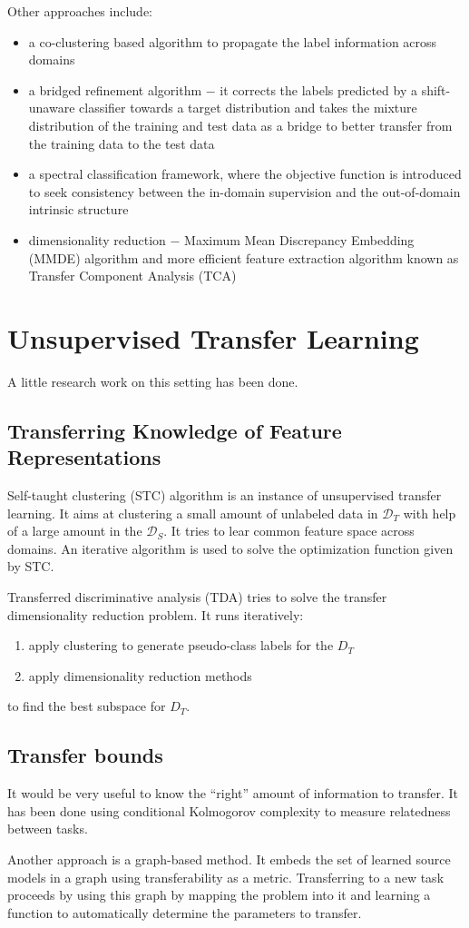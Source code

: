 \documentclass[a4paper,twocolumn]{article}
\newcommand{\D}{\mathcal{D}}
\begin{document}
Other approaches include:
\begin{itemize}
    \item a co-clustering based algorithm to propagate the label information across domains
    \item a bridged refinement algorithm $-$ it corrects the labels predicted by a shift-unaware classifier towards a target distribution and takes the mixture distribution of the training and test data as a bridge to better transfer from the training data to the test data
    \item a spectral classification framework, where the objective function is introduced to seek consistency between the in-domain supervision and the out-of-domain intrinsic structure
    \item dimensionality reduction $-$ Maximum Mean Discrepancy Embedding (MMDE) algorithm and more efficient feature extraction algorithm known as Transfer Component Analysis (TCA)
\end{itemize}

\section{Unsupervised Transfer Learning}
A little research work on this setting has been done.

\subsection{Transferring Knowledge of Feature Representations}
Self-taught clustering (STC) algorithm is an instance of unsupervised transfer learning. It aims at clustering a small amount of unlabeled data in $\D_T$ with help of a large amount in the $\D_S$. It tries to lear common feature space across domains. An iterative algorithm is used to solve the optimization function given by STC.

Transferred discriminative analysis (TDA) tries to solve the transfer dimensionality reduction problem. It runs iteratively:
\begin{enumerate}
    \item apply clustering to generate pseudo-class labels for the $D_T$
    \item apply dimensionality reduction methods
\end{enumerate}
to find the best subspace for $D_T$.

\subsection*{Transfer bounds}
It would be very useful to know the ``right'' amount of information to transfer. It has been done using conditional Kolmogorov complexity to measure relatedness between tasks.

Another approach is a graph-based method. It embeds the set of learned source models in a graph using transferability as a metric. Transferring to a new task proceeds by using this graph by mapping the problem into it and learning a function to automatically determine the parameters to transfer.
\end{document}
